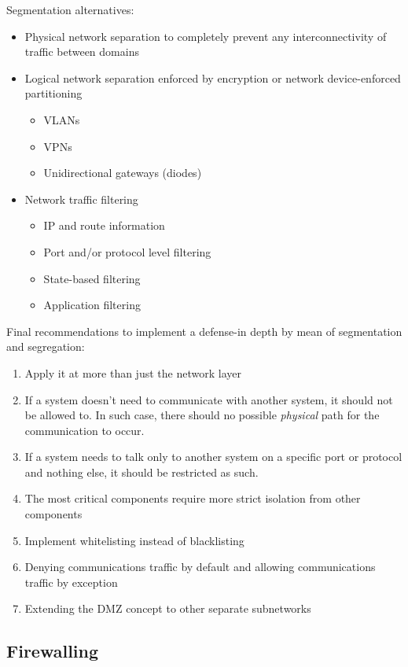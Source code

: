 Segmentation alternatives:
\begin{itemize}
	\item Physical network separation to completely prevent any interconnectivity of traffic between domains
	\item Logical network separation enforced by encryption or network device-enforced partitioning
\begin{itemize}
	\item VLANs
	\item VPNs
	\item Unidirectional gateways (diodes)
\end{itemize}
	\item Network traffic filtering
\begin{itemize}
	\item IP and route information
	\item Port and/or protocol level filtering
	\item State-based filtering
	\item Application filtering
\end{itemize}
\end{itemize}

Final recommendations to implement a defense-in depth by mean of segmentation
and segregation:
\begin{enumerate}
	\item Apply it at more than just the network layer
	\item If a system doesn’t need to communicate with another system, it should not be allowed to. 
	In such case, there should no possible \textit{physical} path for the communication to occur.
	\item If a system needs to talk only to another system on a specific port or protocol and nothing else, it should be restricted as such.
	\item The most critical components require more strict isolation from other components
	\item Implement whitelisting instead of blacklisting
	\item Denying communications traffic by default and allowing communications traffic by exception
	\item Extending the DMZ concept to other separate subnetworks
\end{enumerate}

\subsection{Firewalling}

